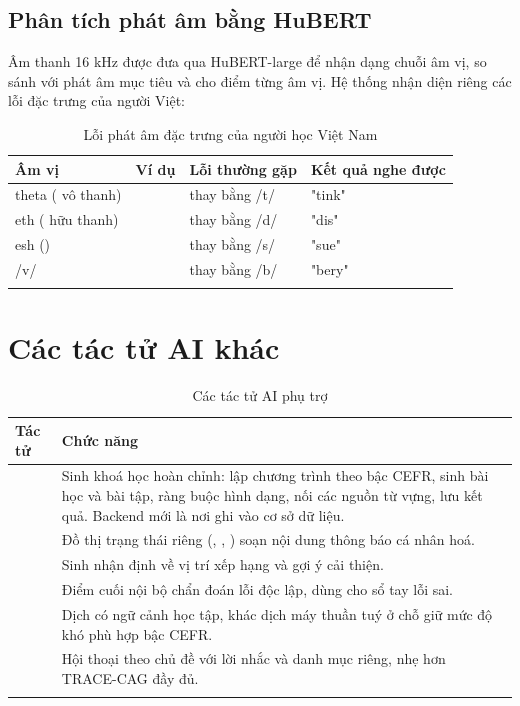 \subsection{Phân tích phát âm bằng HuBERT}

Âm thanh 16 kHz được đưa qua HuBERT-large để nhận dạng chuỗi âm vị, so sánh với phát âm
mục tiêu và cho điểm từng âm vị. Hệ thống nhận diện riêng các lỗi đặc trưng của người
Việt:

\begin{longtable}{L{3.4cm} L{3.0cm} L{3.0cm} L{4.0cm}}
\toprule
\textbf{Âm vị} & \textbf{Ví dụ} & \textbf{Lỗi thường gặp} & \textbf{Kết quả nghe được}\\
\midrule
\endhead
theta ( vô thanh) &  & thay bằng /t/ & "tink"\\
eth ( hữu thanh) &  & thay bằng /d/ & "dis"\\
esh () &  & thay bằng /s/ & "sue"\\
/v/ &  & thay bằng /b/ & "bery"\\
\bottomrule
\caption{Lỗi phát âm đặc trưng của người học Việt Nam}
\end{longtable}

\section{Các tác tử AI khác}

\begin{longtable}{L{3.4cm} L{10.2cm}}
\toprule
\textbf{Tác tử} & \textbf{Chức năng}\\
\midrule
\endhead
{} & Sinh khoá học hoàn chỉnh:  lập chương trình theo bậc CEFR,  sinh bài học và bài tập,  ràng buộc hình dạng,  nối các nguồn từ vựng,  lưu kết quả. Backend  mới là nơi ghi vào cơ sở dữ liệu.\\
 & Đồ thị trạng thái riêng (, , ) soạn nội dung thông báo cá nhân hoá.\\
 & Sinh nhận định về vị trí xếp hạng và gợi ý cải thiện.\\
 & Điểm cuối nội bộ chẩn đoán lỗi độc lập, dùng cho sổ tay lỗi sai.\\
 & Dịch có ngữ cảnh học tập, khác dịch máy thuần tuý ở chỗ giữ mức độ khó phù hợp bậc CEFR.\\
 & Hội thoại theo chủ đề với lời nhắc và danh mục riêng, nhẹ hơn TRACE-CAG đầy đủ.\\
\bottomrule
\caption{Các tác tử AI phụ trợ}
\end{longtable}

